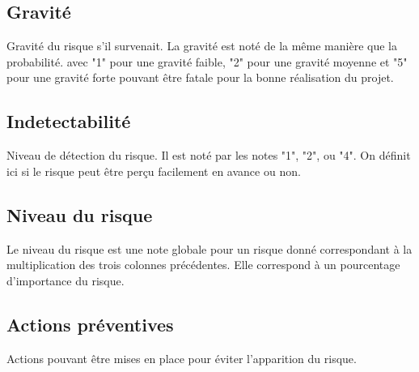 \documentclass[etudiants]{support-iutrs}
\begin{document}
\subsection{Gravité}
Gravité du risque s'il survenait. La gravité est noté de la même manière que la probabilité. avec "1" pour une gravité faible, "2" pour une gravité moyenne et "5" pour une gravité forte pouvant être fatale pour la bonne réalisation du projet.

\subsection{Indetectabilité}
Niveau de détection du risque. Il est noté par les notes "1", "2", ou "4". On définit ici si le risque peut être perçu facilement en avance ou non.

\subsection{Niveau du risque}
Le niveau du risque est une note globale pour un risque donné correspondant à la multiplication des trois colonnes précédentes. Elle correspond à un pourcentage d'importance du risque.

\subsection{Actions préventives}
Actions pouvant être mises en place pour éviter l'apparition du risque.
\end{document}
